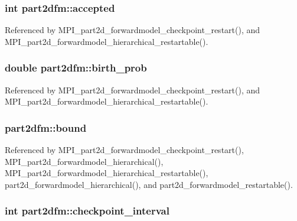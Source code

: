 \subsubsection[{\texorpdfstring{accepted}{accepted}}]{\setlength{\rightskip}{0pt plus 5cm}int part2dfm\+::accepted}\hypertarget{structpart2dfm_a28291682ec748246ce4c758172bffe32}{}\label{structpart2dfm_a28291682ec748246ce4c758172bffe32}


Referenced by M\+P\+I\+\_\+part2d\+\_\+forwardmodel\+\_\+checkpoint\+\_\+restart(), and M\+P\+I\+\_\+part2d\+\_\+forwardmodel\+\_\+hierarchical\+\_\+restartable().

\subsubsection[{\texorpdfstring{birth\+\_\+prob}{birth_prob}}]{\setlength{\rightskip}{0pt plus 5cm}double part2dfm\+::birth\+\_\+prob}\hypertarget{structpart2dfm_a2c88075803d90fecbd53ccc1d6dbc099}{}\label{structpart2dfm_a2c88075803d90fecbd53ccc1d6dbc099}


Referenced by M\+P\+I\+\_\+part2d\+\_\+forwardmodel\+\_\+checkpoint\+\_\+restart(), and M\+P\+I\+\_\+part2d\+\_\+forwardmodel\+\_\+hierarchical\+\_\+restartable().

\subsubsection[{\texorpdfstring{bound}{bound}}]{ part2dfm\+::bound}\hypertarget{structpart2dfm_ac122d0a6bd19305b1cc5f5b4c90664e3}{}\label{structpart2dfm_ac122d0a6bd19305b1cc5f5b4c90664e3}


Referenced by M\+P\+I\+\_\+part2d\+\_\+forwardmodel\+\_\+checkpoint\+\_\+restart(), M\+P\+I\+\_\+part2d\+\_\+forwardmodel\+\_\+hierarchical(), M\+P\+I\+\_\+part2d\+\_\+forwardmodel\+\_\+hierarchical\+\_\+restartable(), part2d\+\_\+forwardmodel\+\_\+hierarchical(), and part2d\+\_\+forwardmodel\+\_\+restartable().

\subsubsection[{\texorpdfstring{checkpoint\+\_\+interval}{checkpoint_interval}}]{\setlength{\rightskip}{0pt plus 5cm}int part2dfm\+::checkpoint\+\_\+interval}\hypertarget{structpart2dfm_af6218a03077acb5ab203ebc433d9dff3}{}\label{structpart2dfm_af6218a03077acb5ab203ebc433d9dff3}


